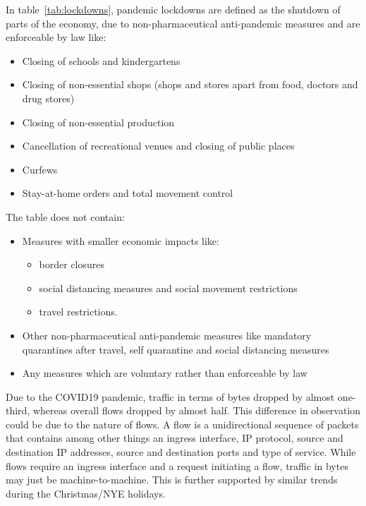 \documentclass[10pt, journal, letterpaper]{IEEEtran}
\begin{document}
In table~\ref{tab:lockdowns}, pandemic lockdowns are defined as the shutdown of parts of the economy, due to non-pharmaceutical anti-pandemic measures and are enforceable by law like:
\begin{itemize}
    \item Closing of schools and kindergartens
    \item Closing of non-essential shops (shops and stores apart from food, doctors and drug stores)
    \item Closing of non-essential production
    \item Cancellation of recreational venues and closing of public places
    \item Curfews
    \item Stay-at-home orders and total movement control
\end{itemize}
The table does not contain:
\begin{itemize}
    \item Measures with smaller economic impacts like:
    \begin{itemize}
        \item border closures
        \item social distancing measures and social movement restrictions
        \item travel restrictions.
    \end{itemize}
    \item Other non-pharmaceutical anti-pandemic measures like mandatory quarantines after travel, self quarantine and social distancing measures
    \item Any measures which are voluntary rather than enforceable by law 
\end{itemize}

Due to the COVID19 pandemic, traffic in terms of bytes dropped by almost one-third, whereas overall flows dropped by almost half. This difference in observation could be due to the nature of flows. A flow is a unidirectional sequence of packets that contains among other things an ingress interface, IP protocol, source and destination IP addresses, source and destination ports and type of service. While flows require an ingress interface and a request initiating a flow, traffic in bytes may just be machine-to-machine. This is further supported by similar trends during the Christmas/NYE holidays.
\end{document}
